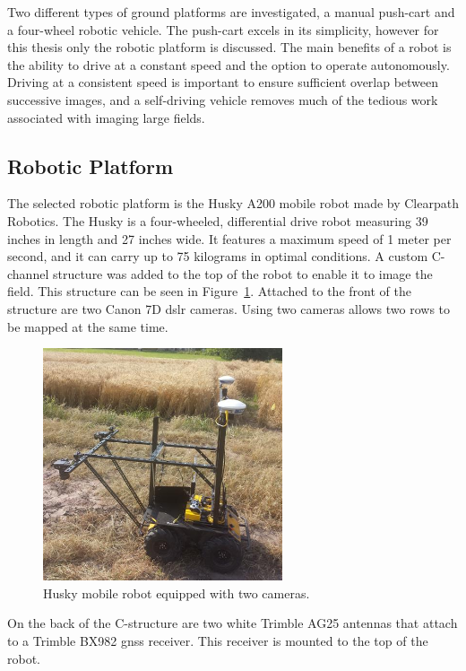 Two different types of ground platforms are investigated, a manual push-cart and a four-wheel robotic vehicle.  The push-cart excels in its simplicity, however for this thesis only the robotic platform is discussed.  The main benefits of a robot is the ability to drive at a constant speed and the option to operate autonomously.  Driving at a consistent speed is important to ensure sufficient overlap between successive images, and a self-driving vehicle removes much of the tedious work associated with imaging large fields.  

\subsection{Robotic Platform}

The selected robotic platform is the Husky A200 mobile robot made by Clearpath Robotics.  The Husky is a four-wheeled, differential drive robot measuring 39 inches in length and 27 inches wide.  It features a maximum speed of 1 meter per second, and it can carry up to 75 kilograms in optimal conditions.  A custom C-channel structure was added to the top of the robot to enable it to image the field.  This structure can be seen in Figure~\ref{husky_rocky_ford}.  Attached to the front of the structure are two Canon 7D \ac{dslr} cameras.  Using two cameras allows two rows to be mapped at the same time. 

\begin{figure}
	\centering
    \includegraphics[height=2.7in]{figures/sunflower_rocky_ford_labeled_small.jpg}
    \caption[Husky robot]{Husky mobile robot equipped with two cameras.}
    \label{husky_rocky_ford}
\end{figure}

On the back of the C-structure are two white Trimble AG25 antennas that attach to a Trimble BX982 \ac{gnss} receiver.  This receiver is mounted to the top of the robot.

